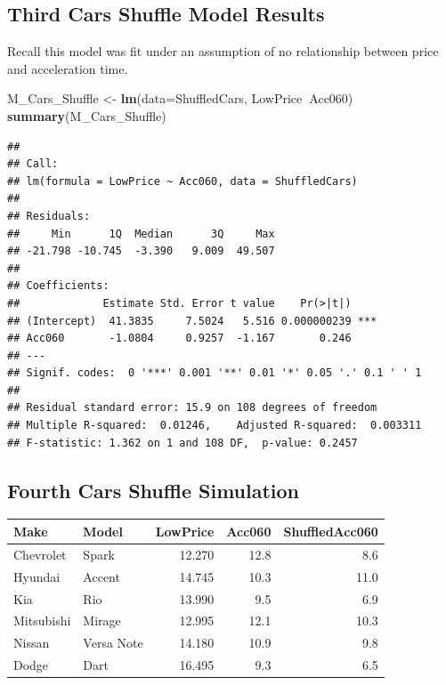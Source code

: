 \documentclass[]{book}
\newenvironment{Shaded}{\begin{snugshade}}{\end{snugshade}}
\newcommand{\KeywordTok}[1]{\textcolor[rgb]{0.13,0.29,0.53}{\textbf{#1}}}
\newcommand{\DataTypeTok}[1]{\textcolor[rgb]{0.13,0.29,0.53}{#1}}
\newcommand{\DecValTok}[1]{\textcolor[rgb]{0.00,0.00,0.81}{#1}}
\newcommand{\StringTok}[1]{\textcolor[rgb]{0.31,0.60,0.02}{#1}}
\newcommand{\OperatorTok}[1]{\textcolor[rgb]{0.81,0.36,0.00}{\textbf{#1}}}
\newcommand{\NormalTok}[1]{#1}
\begin{document}
\subsection{Third Cars Shuffle Model
Results}\label{third-cars-shuffle-model-results}

Recall this model was fit under an assumption of no relationship between
price and acceleration time.

\begin{Shaded}
\begin{Highlighting}[]
\NormalTok{M_Cars_Shuffle <-}\StringTok{ }\KeywordTok{lm}\NormalTok{(}\DataTypeTok{data=}\NormalTok{ShuffledCars, LowPrice}\OperatorTok{~}\NormalTok{Acc060)}
\KeywordTok{summary}\NormalTok{(M_Cars_Shuffle)}
\end{Highlighting}
\end{Shaded}

\begin{verbatim}
## 
## Call:
## lm(formula = LowPrice ~ Acc060, data = ShuffledCars)
## 
## Residuals:
##     Min      1Q  Median      3Q     Max 
## -21.798 -10.745  -3.390   9.009  49.507 
## 
## Coefficients:
##             Estimate Std. Error t value    Pr(>|t|)    
## (Intercept)  41.3835     7.5024   5.516 0.000000239 ***
## Acc060       -1.0804     0.9257  -1.167       0.246    
## ---
## Signif. codes:  0 '***' 0.001 '**' 0.01 '*' 0.05 '.' 0.1 ' ' 1
## 
## Residual standard error: 15.9 on 108 degrees of freedom
## Multiple R-squared:  0.01246,    Adjusted R-squared:  0.003311 
## F-statistic: 1.362 on 1 and 108 DF,  p-value: 0.2457
\end{verbatim}

\subsection{Fourth Cars Shuffle
Simulation}\label{fourth-cars-shuffle-simulation}

\begin{Shaded}
\end{Shaded}

\begin{tabular}{l|l|r|r|r}
\hline
Make & Model & LowPrice & Acc060 & ShuffledAcc060\\
\hline
Chevrolet & Spark & 12.270 & 12.8 & 8.6\\
\hline
Hyundai & Accent & 14.745 & 10.3 & 11.0\\
\hline
Kia & Rio & 13.990 & 9.5 & 6.9\\
\hline
Mitsubishi & Mirage & 12.995 & 12.1 & 10.3\\
\hline
Nissan & Versa Note & 14.180 & 10.9 & 9.8\\
\hline
Dodge & Dart & 16.495 & 9.3 & 6.5\\
\hline
\end{tabular}
\end{document}
